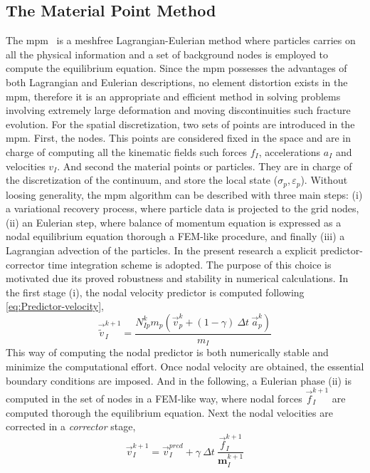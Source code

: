 \documentclass[preprint,12pt,a4paper]{elsarticle}
\newcommand{\tens}[1]{
  \ensuremath{\mathbf{{#1}}}
}
\begin{document}
\subsection{The Material Point Method}
\label{sec:2.1}
The \acrshort{mpm}~\cite{Sulsky1994} is a meshfree Lagrangian-Eulerian method
where particles carries on all the physical information and a set of
background nodes is employed to compute the equilibrium
equation. Since the \acrshort{mpm} possesses the advantages of both Lagrangian
and Eulerian descriptions, no element distortion exists in the \acrshort{mpm},
therefore it is an appropriate and efficient method in solving
problems involving extremely large deformation and moving
discontinuities such fracture evolution. For the spatial
discretization, two sets of points are introduced in 
the \acrshort{mpm}. First, the nodes. This points are considered fixed in the
space and are in charge of computing all the kinematic fields such
forces $f_I$, accelerations $a_I$ and velocities $v_I$. And second the
material points or particles. They are in charge of the discretization
of the continuum, and store the local state ($\sigma_p,
\varepsilon_p$). Without loosing generality, the \acrshort{mpm} algorithm
can be described with three main steps: (i) a variational recovery
process, where particle data is projected to the grid nodes, (ii) an
Eulerian step, where balance of momentum equation is expressed as a
nodal equilibrium equation thorough a FEM-like procedure, and finally
(iii) a Lagrangian advection of the particles. In the present research
a explicit predictor-corrector time integration
scheme is adopted. The purpose of this choice is motivated due its proved
robustness and stability in numerical calculations. In the first stage
(i), the nodal velocity predictor is computed following
\eqref{eq:Predictor-velocity}, 
\begin{equation}
  \label{eq:Predictor-velocity}
  \vec{\tilde{v}}_I^{k+1} = \frac{ N_{Ip}^{k} m_p (\vec{v}_p^k + (1 - \gamma)\ \Delta t\ \vec{a}_p^k)}{m_I}
\end{equation}
This way of computing the nodal predictor is both numerically stable
and minimize the computational effort. Once nodal velocity are
obtained, the essential boundary conditions are imposed. And in the
following, a Eulerian phase (ii) is computed in the set of nodes in a
FEM-like way, where nodal forces $\vec{f}_{I}^{k+1}$ are computed thorough the
equilibrium equation. Next the nodal velocities are corrected in a
\textit{corrector} stage,
\begin{equation}
  \label{eq:Corrector-velocity}
  \vec{v}_{I}^{k+1} = \vec{v}_{I}^{pred} + \gamma\ \Delta t\ \frac{\vec{f}_{I}^{k+1}}{\tens{m}_I^{k+1}}
\end{equation}
\end{document}
